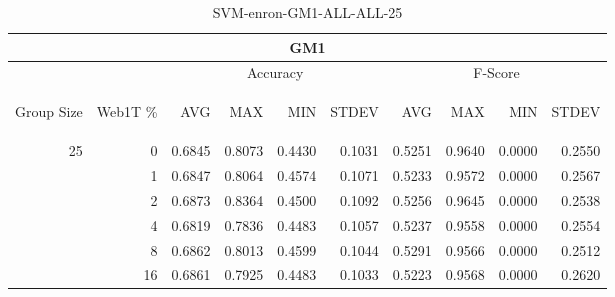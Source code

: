 \begin{center}
\begin{table}[htbp] 
 \begin{center}
\begin{tabular}{ | r | r | r | r | r | r | r | r | r | r |}
\hline
\multicolumn{10}{|c|}{GM1}\\
\hline
 & & \multicolumn{4}{|c|}{Accuracy} & \multicolumn{4}{|c|}{F-Score}\\ \cline{3-10}
\begin{sideways}Group Size\end{sideways} & \begin{sideways}Web1T \%\end{sideways} & \begin{sideways}AVG\end{sideways} & \begin{sideways}MAX\end{sideways} & \begin{sideways}MIN\end{sideways} & \begin{sideways}STDEV\end{sideways} & \begin{sideways}AVG\end{sideways} & \begin{sideways}MAX\end{sideways} & \begin{sideways}MIN\end{sideways} & \begin{sideways}STDEV\end{sideways}\\
\hline
\multirow{5}{*}{25}
 & 0 & 0.6845 & 0.8073 & 0.4430 & 0.1031 & 0.5251 & 0.9640 & 0.0000 & 0.2550\\ \cline{2-10}
 & 1 & 0.6847 & 0.8064 & 0.4574 & 0.1071 & 0.5233 & 0.9572 & 0.0000 & 0.2567\\ \cline{2-10}
 & 2 & 0.6873 & 0.8364 & 0.4500 & 0.1092 & 0.5256 & 0.9645 & 0.0000 & 0.2538\\ \cline{2-10}
 & 4 & 0.6819 & 0.7836 & 0.4483 & 0.1057 & 0.5237 & 0.9558 & 0.0000 & 0.2554\\ \cline{2-10}
 & 8 & 0.6862 & 0.8013 & 0.4599 & 0.1044 & 0.5291 & 0.9566 & 0.0000 & 0.2512\\ \cline{2-10}
 & 16 & 0.6861 & 0.7925 & 0.4483 & 0.1033 & 0.5223 & 0.9568 & 0.0000 & 0.2620\\ \cline{2-10}
\hline
\end{tabular}
\caption{SVM-enron-GM1-ALL-ALL-25}
\label{table:SVM-enron-GM1-ALL-ALL-25}
\end{center}
 \end{table}
\end{center}

